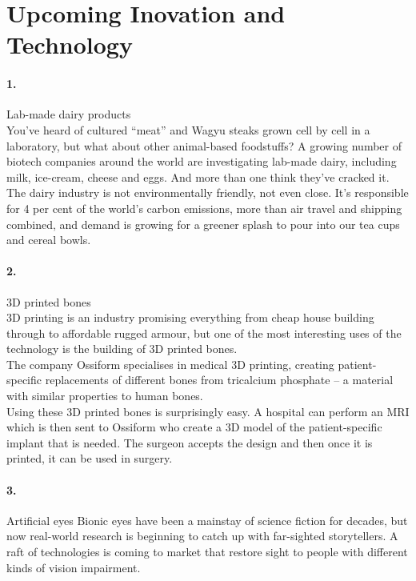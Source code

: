 \documentclass[12pt]{report}
\begin{document}
\section{Upcoming Inovation and Technology}\paragraph{1.}
Lab-made dairy products\\
You’ve heard of cultured “meat” and Wagyu steaks grown cell by cell in a laboratory, but what about other animal-based foodstuffs? A growing number of biotech companies around the world are investigating lab-made dairy, including milk, ice-cream, cheese and eggs. And more than one think they’ve cracked it.\\
The dairy industry is not environmentally friendly, not even close. It’s responsible for 4 per cent of the world’s carbon emissions, more than air travel and shipping combined, and demand is growing for a greener splash to pour into our tea cups and cereal bowls.\paragraph{2.}

3D printed bones\\
3D printing is an industry promising everything from cheap house building through to affordable rugged armour, but one of the most interesting uses of the technology is the building of 3D printed bones.\\
The company Ossiform specialises in medical 3D printing, creating patient-specific replacements of different bones from tricalcium phosphate – a material with similar properties to human bones.\\
Using these 3D printed bones is surprisingly easy. A hospital can perform an MRI which is then sent to Ossiform who create a 3D model of the patient-specific implant that is needed. The surgeon accepts the design and then once it is printed, it can be used in surgery.\paragraph{3.}

Artificial eyes
Bionic eyes have been a mainstay of science fiction for decades, but now real-world research is beginning to catch up with far-sighted storytellers. A raft of technologies is coming to market that restore sight to people with different kinds of vision impairment.
\end{document}
